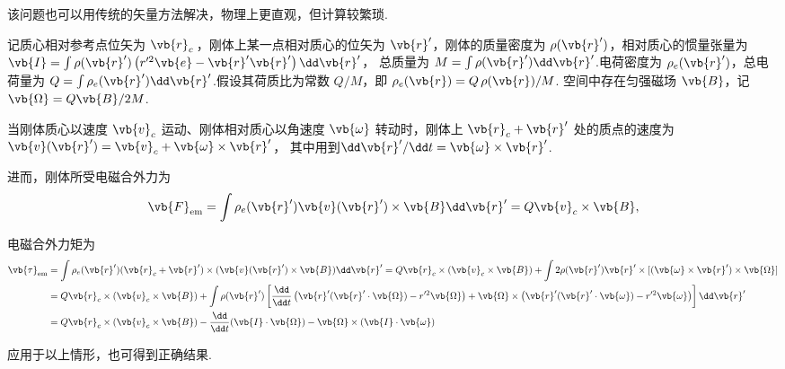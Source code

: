 \begin{note}
	该问题也可以用传统的矢量方法解决，物理上更直观，但计算较繁琐.

	记质心相对参考点位矢为 \(\vb{r}_c\,\)，刚体上某一点相对质心的位矢为 \(\vb{r}'\)，刚体的质量密度为 \(\rho(\vb{r}')\)，相对质心的惯量张量为 \(\vb{I}= \int \rho(\vb{r}') \left( r'^2 \vb{e} - \vb{r}' \vb{r}' \right) \dd \vb{r}'\)，
	总质量为 \(M = \int \rho(\vb{r}') \dd \vb{r}'\).电荷密度为 \(\rho_e(\vb{r}')\)，总电荷量为 \(Q = \int \rho_e(\vb{r}') \dd \vb{r}'\).假设其荷质比为常数 \(Q/M\)，即 \(\rho_e(\vb{r}) = Q \,\rho(\vb{r})/M\).
	空间中存在匀强磁场 \(\vb{B}\)，记 \(\vb{\Omega} = Q\vb{B}/2M\).

	当刚体质心以速度 \(\vb{v}_c\) 运动、刚体相对质心以角速度 \(\vb{\omega}\) 转动时，刚体上 \(\vb{r}_c + \vb{r}'\) 处的质点的速度为 \(\vb{v}(\vb{r}') = \vb{v}_c + \vb{\omega} \times \vb{r}'\)，
	其中用到\(\dd \vb{r}'/\dd t = \vb{\omega} \times \vb{r}'\).

	进而，刚体所受电磁合外力为
	\begin{align*}
		\vb{F}_{\text{em}} = \int \rho_e(\vb{r}') \vb{v}(\vb{r}') \times \vb{B} \dd \vb{r}' = Q \vb{v}_c \times \vb{B},
	\end{align*}

	电磁合外力矩为
	\begin{align*}
		\vb{\tau}_{\text{em}} & = \int \rho_e(\vb{r}') (\vb{r}_c + \vb{r}') \times (\vb{v}(\vb{r}') \times \vb{B}) \dd \vb{r}' = Q \vb{r}_c \times (\vb{v}_c \times \vb{B}) + \int 2 \rho(\vb{r}') \vb{r}' \times [(\vb{\omega} \times \vb{r}') \times \vb{\Omega}]                                           \\
		                      & = Q \vb{r}_c \times (\vb{v}_c \times \vb{B}) + \int \rho(\vb{r}') \left[ \frac{\dd}{\dd t} \left( \vb{r}' (\vb{r}' \cdot \vb{\Omega}) - r'^2 \vb{\Omega} \right) + \vb{\Omega} \times \left( \vb{r}' (\vb{r}' \cdot \vb{\omega}) - r'^2 \vb{\omega} \right) \right] \dd \vb{r}' \\
		                      & = Q \vb{r}_c \times (\vb{v}_c \times \vb{B}) - \frac{\dd}{\dd t} (\vb{I} \cdot \vb{\Omega}) - \vb{\Omega} \times (\vb{I} \cdot \vb{\omega})
	\end{align*}

	应用于以上情形，也可得到正确结果.
\end{note}
